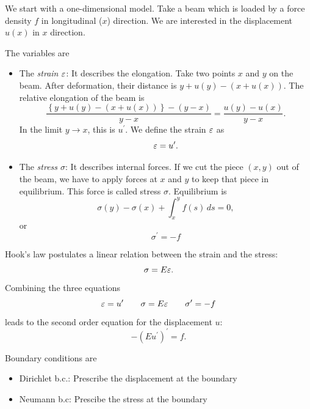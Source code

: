 We start with a one-dimensional model. Take a beam which is loaded by a force density $f$
in longitudinal ($x$) direction. We are interested in the displacement $u(x)$ in $x$
direction.

The variables are
\begin{itemize}
\item The {\em strain $\varepsilon$}: It describes the elongation. Take two points $x$ and $y$ on 
the beam. After deformation, their distance is $y+u(y) - (x+u(x))$. The relative elongation 
of the beam is
$$
\frac{ \left\{ y+u(y) - (x+u(x)) \right\}  - (y-x) }{y-x} = \frac{u(y)-u(x)}{y-x}.
$$
In the limit $y \rightarrow x$, this is $u^\prime$. We define the strain $\varepsilon$ as
$$
\varepsilon = u^\prime.
$$
\item The {\em stress $\sigma$}: It describes internal forces. If we cut the piece $(x,y)$ 
out of the beam, we have to apply forces at $x$ and $y$ to keep that piece in equilibrium.
This force is called stress $\sigma$. Equilibrium is
$$
\sigma(y) - \sigma(x) + \int_x^y f(s) \, ds = 0,
$$
or 
$$
\sigma^\prime = -f
$$
\end{itemize}
Hook's law postulates a linear relation between the strain and the stress:
$$
\sigma = E \varepsilon.
$$
Combining the three equations
$$
\varepsilon = u^\prime \qquad \sigma = E \varepsilon \qquad \sigma^\prime = -f
$$
leads to the second order equation for the displacement $u$:
$$
-(E u^\prime)^\prime = f.
$$

Boundary conditions are
\begin{itemize}
\item Dirichlet b.c.: Prescribe the displacement at the boundary
\item Neumann b.c: Prescibe the stress at the boundary
\end{itemize}

